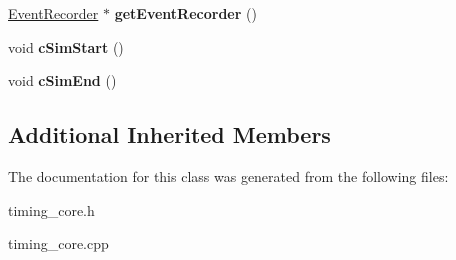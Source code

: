\begin{DoxyCompactItemize}
\item 
\hypertarget{classTimingCore_af5ed643b8753ec8d17a85a9c20b75862}{\hyperlink{classEventRecorder}{Event\-Recorder} $\ast$ {\bfseries get\-Event\-Recorder} ()}\label{classTimingCore_af5ed643b8753ec8d17a85a9c20b75862}

\item 
\hypertarget{classTimingCore_a8bcea2d841226aaeb8106216572e6fa3}{void {\bfseries c\-Sim\-Start} ()}\label{classTimingCore_a8bcea2d841226aaeb8106216572e6fa3}

\item 
\hypertarget{classTimingCore_a0c85a00303cba302d71ea828a47c3822}{void {\bfseries c\-Sim\-End} ()}\label{classTimingCore_a0c85a00303cba302d71ea828a47c3822}

\end{DoxyCompactItemize}
\subsection*{Additional Inherited Members}


The documentation for this class was generated from the following files\-:\begin{DoxyCompactItemize}
\item 
timing\-\_\-core.\-h\item 
timing\-\_\-core.\-cpp\end{DoxyCompactItemize}
